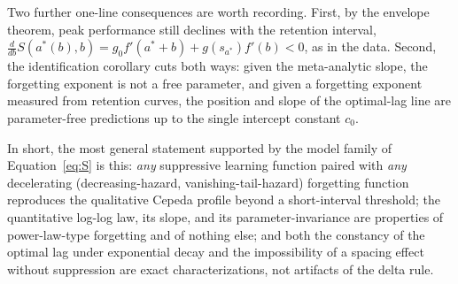 \documentclass[man, 12pt, floatsintext]{apa6}
\theoremstyle{definition}
\theoremstyle{remark}
\begin{document}
Two further one-line consequences are worth recording. First, by the envelope theorem, peak performance still declines with the retention interval, $\frac{d}{db} S(a^*(b), b) = g_0 f'(a^*+b) + g(s_{a^*}) f'(b) < 0$, as in the data. Second, the identification corollary cuts both ways: given the meta-analytic slope, the forgetting exponent is not a free parameter, and given a forgetting exponent measured from retention curves, the position and slope of the optimal-lag line are parameter-free predictions up to the single intercept constant $c_0$.

In short, the most general statement supported by the model family of Equation~\ref{eq:S} is this: \emph{any} suppressive learning function paired with \emph{any} decelerating (decreasing-hazard, vanishing-tail-hazard) forgetting function reproduces the qualitative Cepeda profile beyond a short-interval threshold; the quantitative log-log law, its slope, and its parameter-invariance are properties of power-law-type forgetting and of nothing else; and both the constancy of the optimal lag under exponential decay and the impossibility of a spacing effect without suppression are exact characterizations, not artifacts of the delta rule.


\end{document}
